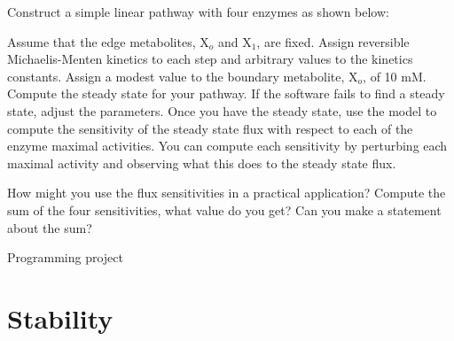 \documentclass[12pt]{article}
\begin{document}
\begin{question}
Construct a simple linear pathway with four enzymes as shown below:
%
\begin{center}
\end{center}

Assume that the edge metabolites, X$_o$ and X$_1$, are fixed. Assign reversible Michaelis-Menten kinetics to each step and arbitrary values to the kinetics constants.  Assign a modest value to the boundary metabolite, X$_o$, of 10 mM. Compute the steady state for your pathway. If the software fails to find a steady state, adjust the parameters. Once you have the steady state, use the model to compute the sensitivity of the steady state flux with respect to each of the enzyme maximal activities. You can compute each sensitivity by perturbing each maximal activity and observing what this does to the steady state flux.

How might you use the flux sensitivities in a practical application? Compute the sum of the four sensitivities, what value do you get? Can you make a statement about the sum?
\end{question}
\begin{solution}
Programming project
\end{solution}




\section{Stability}
\end{document}
